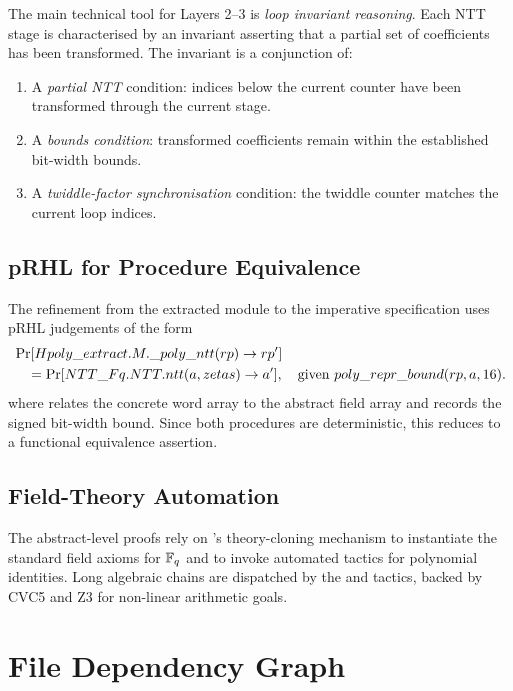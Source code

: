 The main technical tool for Layers 2--3 is \emph{loop invariant reasoning}.
Each NTT stage is characterised by an invariant asserting that a
partial set of coefficients has been transformed.  The invariant is a
conjunction of:
\begin{enumerate}
  \item A \emph{partial NTT} condition: indices below the current
        counter have been transformed through the current stage.
  \item A \emph{bounds condition}: transformed coefficients remain
        within the established bit-width bounds.
  \item A \emph{twiddle-factor synchronisation} condition: the twiddle
        counter matches the current loop indices.
\end{enumerate}

\subsection{pRHL for Procedure Equivalence}

The refinement from the extracted module to the imperative specification
uses pRHL judgements of the form
\[
\begin{aligned}
  &\Pr[Hpoly\_extract.M.\_poly\_ntt(rp) \to rp'] \\
  &\quad =
    \Pr[NTT\_Fq.NTT.ntt(a, zetas) \to a'],
    \quad \text{given } poly\_repr\_bound(rp,a,16).
\end{aligned}
\]
where  relates the concrete word array  to the
abstract field array  and records the signed bit-width bound.  Since
both procedures are deterministic, this reduces to a functional equivalence
assertion.

\subsection{Field-Theory Automation}

The abstract-level proofs rely on \easycrypt{}'s theory-cloning mechanism to
instantiate the standard field axioms for $\mathbb{F}_q$ and to invoke automated
tactics for polynomial identities.  Long algebraic chains are dispatched by
the  and  tactics, backed by CVC5 and Z3 for non-linear
arithmetic goals.

\section{File Dependency Graph}

